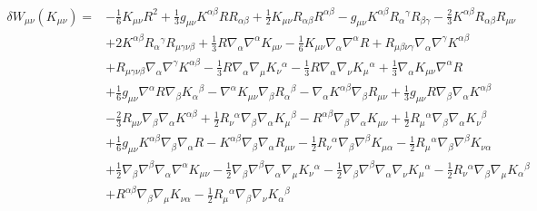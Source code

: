 \documentclass[10pt,letterpaper]{article}
\begin{document}
\begin{align}
\delta W_{\mu\nu}(K_{\mu\nu})={}&- \tfrac{1}{6} K_{\mu \nu} R^2
 + \tfrac{1}{3} g_{\mu \nu} K^{\alpha \beta} R R_{\alpha \beta}
 + \tfrac{1}{2} K_{\mu \nu} R_{\alpha \beta} R^{\alpha \beta}
 -  g_{\mu \nu} K^{\alpha \beta} R_{\alpha}{}^{\gamma} R_{\beta \gamma}
 -  \tfrac{2}{3} K^{\alpha \beta} R_{\alpha \beta} R_{\mu \nu}\nonumber\\
& + 2 K^{\alpha \beta} R_{\alpha}{}^{\gamma} R_{\mu \gamma \nu \beta}
 + \tfrac{1}{3} R \nabla_{\alpha}\nabla^{\alpha}K_{\mu \nu}
 -  \tfrac{1}{6} K_{\mu \nu} \nabla_{\alpha}\nabla^{\alpha}R
 + R_{\mu \beta \nu \gamma} \nabla_{\alpha}\nabla^{\gamma}K^{\alpha \beta}\nonumber\\
& + R_{\mu \gamma \nu \beta} \nabla_{\alpha}\nabla^{\gamma}K^{\alpha \beta}
 -  \tfrac{1}{3} R \nabla_{\alpha}\nabla_{\mu}K_{\nu}{}^{\alpha}
 -  \tfrac{1}{3} R \nabla_{\alpha}\nabla_{\nu}K_{\mu}{}^{\alpha}
 + \tfrac{1}{3} \nabla_{\alpha}K_{\mu \nu} \nabla^{\alpha}R\nonumber\\
& + \tfrac{1}{6} g_{\mu \nu} \nabla^{\alpha}R \nabla_{\beta}K_{\alpha}{}^{\beta}
 -  \nabla^{\alpha}K_{\mu \nu} \nabla_{\beta}R_{\alpha}{}^{\beta}
 -  \nabla_{\alpha}K^{\alpha \beta} \nabla_{\beta}R_{\mu \nu}
 + \tfrac{1}{3} g_{\mu \nu} R \nabla_{\beta}\nabla_{\alpha}K^{\alpha \beta}\nonumber\\
& -  \tfrac{2}{3} R_{\mu \nu} \nabla_{\beta}\nabla_{\alpha}K^{\alpha \beta}
 + \tfrac{1}{2} R_{\nu}{}^{\alpha} \nabla_{\beta}\nabla_{\alpha}K_{\mu}{}^{\beta}
 -  R^{\alpha \beta} \nabla_{\beta}\nabla_{\alpha}K_{\mu \nu}
 + \tfrac{1}{2} R_{\mu}{}^{\alpha} \nabla_{\beta}\nabla_{\alpha}K_{\nu}{}^{\beta}\nonumber\\
& + \tfrac{1}{6} g_{\mu \nu} K^{\alpha \beta} \nabla_{\beta}\nabla_{\alpha}R
 -  K^{\alpha \beta} \nabla_{\beta}\nabla_{\alpha}R_{\mu \nu}
 -  \tfrac{1}{2} R_{\nu}{}^{\alpha} \nabla_{\beta}\nabla^{\beta}K_{\mu \alpha}
 -  \tfrac{1}{2} R_{\mu}{}^{\alpha} \nabla_{\beta}\nabla^{\beta}K_{\nu \alpha}\nonumber\\
& + \tfrac{1}{2} \nabla_{\beta}\nabla^{\beta}\nabla_{\alpha}\nabla^{\alpha}K_{\mu \nu}
 -  \tfrac{1}{2} \nabla_{\beta}\nabla^{\beta}\nabla_{\alpha}\nabla_{\mu}K_{\nu}{}^{\alpha}
 -  \tfrac{1}{2} \nabla_{\beta}\nabla^{\beta}\nabla_{\alpha}\nabla_{\nu}K_{\mu}{}^{\alpha}
 -  \tfrac{1}{2} R_{\nu}{}^{\alpha} \nabla_{\beta}\nabla_{\mu}K_{\alpha}{}^{\beta}\nonumber\\
& + R^{\alpha \beta} \nabla_{\beta}\nabla_{\mu}K_{\nu \alpha}
 -  \tfrac{1}{2} R_{\mu}{}^{\alpha} \nabla_{\beta}\nabla_{\nu}K_{\alpha}{}^{\beta}

\end{align}
\end{document}
